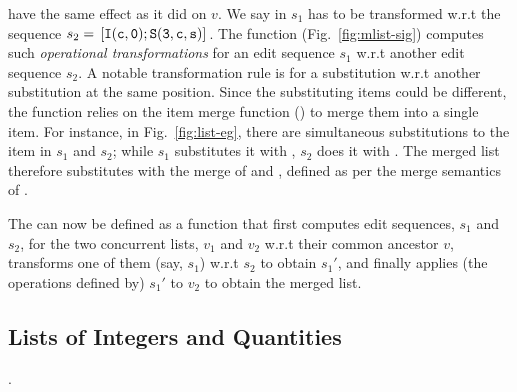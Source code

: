 \begin{itemize}
		have the same effect as it did on $v$. We say  in $s_1$ has to be
		transformed w.r.t the sequence $s_2 = \,{\tt [I(c,0);S(3,c,s)]}\,$.  The function
		 (Fig.~\ref{fig:mlist-sig}) computes such
		\emph{operational transformations} for an edit sequence $s_1$ w.r.t another
		edit sequence $s_2$. A notable transformation rule is for a substitution
		w.r.t another substitution at the same position. Since the substituting
		items could be different, the function relies on the item merge function
		() to merge them into a single item. For instance, in
		Fig.~\ref{fig:list-eg}, there are simultaneous substitutions to the item
		 in $s_1$ and $s_2$; while $s_1$ substitutes it with , $s_2$ does
		it with . The merged list therefore substitutes  with the merge
		of  and , defined as per the merge semantics of .
\end{itemize}
The  can now be defined as a function that first
computes edit sequences, $s_1$ and $s_2$, for the two concurrent
lists, $v_1$ and $v_2$ w.r.t their common ancestor $v$, transforms one
of them (say, $s_1$) w.r.t $s_2$ to obtain $s_1'$, and finally applies
(the operations defined by) $s_1'$ to $v_2$ to obtain the merged list.

\subsection{Lists of Integers and Quantities}.

